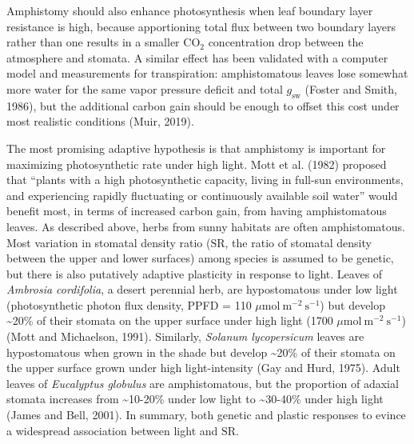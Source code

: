 \documentclass[
  letterpaper,
  DIV=11,
  numbers=noendperiod]{scrartcl}
\begin{document}
Amphistomy should also enhance photosynthesis when leaf boundary layer
resistance is high, because apportioning total flux between two boundary
layers rather than one results in a smaller CO\(_2\) concentration drop
between the atmosphere and stomata. A similar effect has been validated
with a computer model and measurements for transpiration: amphistomatous
leaves lose somewhat more water for the same vapor pressure deficit and
total \(g_\mathrm{sw}\) (Foster and Smith, 1986), but the additional
carbon gain should be enough to offset this cost under most realistic
conditions (Muir, 2019).

The most promising adaptive hypothesis is that amphistomy is important
for maximizing photosynthetic rate under high light. Mott et al. (1982)
proposed that ``plants with a high photosynthetic capacity, living in
full-sun environments, and experiencing rapidly fluctuating or
continuously available soil water'' would benefit most, in terms of
increased carbon gain, from having amphistomatous leaves. As described
above, herbs from sunny habitats are often amphistomatous. Most
variation in stomatal density ratio (\(\mathrm{SR}\), the ratio of
stomatal density between the upper and lower surfaces) among species is
assumed to be genetic, but there is also putatively adaptive plasticity
in response to light. Leaves of \emph{Ambrosia cordifolia}, a desert
perennial herb, are hypostomatous under low light (photosynthetic photon
flux density, PPFD = 110 \(\mu \text{mol}~\text{m}^{-2}~\text{s}^{-1}\))
but develop \textasciitilde20\% of their stomata on the upper surface
under high light (1700 \(\mu \text{mol}~\text{m}^{-2}~\text{s}^{-1}\))
(Mott and Michaelson, 1991). Similarly, \emph{Solanum lycopersicum}
leaves are hypostomatous when grown in the shade but develop
\textasciitilde20\% of their stomata on the upper surface grown under
high light-intensity (Gay and Hurd, 1975). Adult leaves of
\emph{Eucalyptus globulus} are amphistomatous, but the proportion of
adaxial stomata increases from \textasciitilde10-20\% under low light to
\textasciitilde30-40\% under high light (James and Bell, 2001). In
summary, both genetic and plastic responses to evince a widespread
association between light and \(\mathrm{SR}\).
\end{document}

